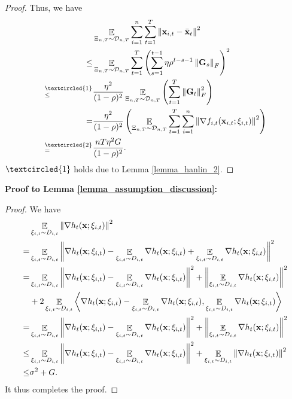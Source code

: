 \documentclass{article}
\begin{document}
\begin{proof}
Thus, we  have
\begin{align}
\nonumber
& \EE_{ \Xi_{n,T} \sim \Dcal_{n,T} } \sum_{i=1}^n\sum_{t=1}^T \lrnorm{\x_{i,t} - \bar{\x}_t}^2  \\ \nonumber 
\le & \EE_{ \Xi_{n,T} \sim \Dcal_{n,T} } \sum_{t=1}^T \lrincir{ \sum_{s=1}^{t-1} \eta \rho^{t-s-1} \lrnorm{\G_s}_F}^2  \\ \nonumber
\refabovecir{\le}{\textcircled{1}} & \frac{\eta^2}{(1-\rho)^2} \EE_{ \Xi_{n,T} \sim \Dcal_{n,T} } \lrincir{  \sum_{t=1}^T \lrnorm{\G_t}_F^2 } \\ \nonumber
= & \frac{\eta^2}{(1-\rho)^2} \lrincir{ \EE_{ \Xi_{n,T} \sim \Dcal_{n,T} } \sum_{t=1}^T \sum_{i=1}^n  \lrnorm{\nabla f_{i,t}(\x_{i,t};\xi_{i,t})}^2 } \\ \nonumber
\refabovecir{=}{\textcircled{2}} & \frac{nT\eta^2 G }{(1-\rho)^2}.
\end{align} $\textcircled{1}$ holds due to Lemma \ref{lemma_hanlin_2}. 
\end{proof}



\textbf{ Proof to Lemma \ref{lemma_assumption_discussion}:}
\begin{proof}
We have
\begin{align}
\nonumber
&\mathop{\mathbb{E}}_{ \xi_{i,t} \sim D_{i,t} }\left\lVert\nabla h_t({\bf x};\xi_{i,t})\right\rVert^2 \\ \nonumber 
= & \mathop{\mathbb{E}}_{ \xi_{i,t} \sim D_{i,t} }\left\lVert\nabla h_t({\bf x};\xi_{i,t}) - \mathop{\mathbb{E}}_{ \xi_{i,t} \sim D_{i,t} }\nabla h_t({\bf x};\xi_{i,t}) + \mathop{\mathbb{E}}_{ \xi_{i,t} \sim D_{i,t} }\nabla h_t({\bf x};\xi_{i,t})\right\rVert^2 \\ \nonumber
= & \mathop{\mathbb{E}}_{ \xi_{i,t} \sim D_{i,t} }\left\lVert\nabla h_t({\bf x};\xi_{i,t}) - \mathop{\mathbb{E}}_{ \xi_{i,t} \sim D_{i,t} }\nabla h_t({\bf x};\xi_{i,t})\right\rVert^2 + \left\lVert\mathop{\mathbb{E}}_{ \xi_{i,t} \sim D_{i,t} }\nabla h_t({\bf x};\xi_{i,t})\right\rVert^2 \\ \nonumber
& + 2\mathop{\mathbb{E}}_{ \xi_{i,t} \sim D_{i,t} }\left\langle\nabla h_t({\bf x};\xi_{i,t}) - \mathop{\mathbb{E}}_{ \xi_{i,t} \sim D_{i,t} }\nabla h_t({\bf x};\xi_{i,t}),\mathop{\mathbb{E}}_{ \xi_{i,t} \sim D_{i,t} }\nabla h_t({\bf x};\xi_{i,t}) \right\rangle \\ \nonumber
= & \mathop{\mathbb{E}}_{ \xi_{i,t} \sim D_{i,t} }\left\lVert\nabla h_t({\bf x};\xi_{i,t}) - \mathop{\mathbb{E}}_{ \xi_{i,t} \sim D_{i,t} }\nabla h_t({\bf x};\xi_{i,t})\right\rVert^2 + \left\lVert\mathop{\mathbb{E}}_{ \xi_{i,t} \sim D_{i,t} }\nabla h_t({\bf x};\xi_{i,t})\right\rVert^2  \\ \nonumber
\le & \mathop{\mathbb{E}}_{ \xi_{i,t} \sim D_{i,t} }\left\lVert\nabla h_t({\bf x};\xi_{i,t}) - \mathop{\mathbb{E}}_{ \xi_{i,t} \sim D_{i,t} }\nabla h_t({\bf x};\xi_{i,t})\right\rVert^2 + \mathop{\mathbb{E}}_{ \xi_{i,t} \sim D_{i,t} }\left\lVert\nabla h_t({\bf x};\xi_{i,t})\right\rVert^2  \\ \nonumber
\le & \sigma^2 + G.
\end{align} It thus completes the proof.
\end{proof}
\end{document}
